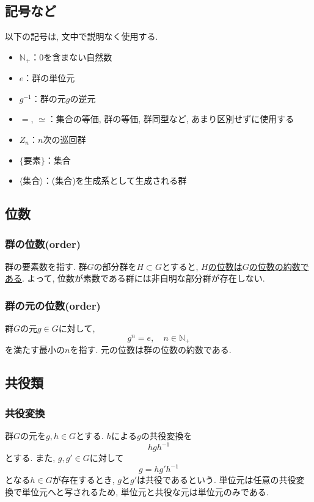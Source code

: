 \documentclass[11pt, a4paper]{jsarticle}
\begin{document}
\subsection{記号など}
以下の記号は, 文中で説明なく使用する.
\begin{itemize}
\item $\mathbb{N}_+$：0を含まない自然数
\item $e$：群の単位元
\item $g^{-1}$：群の元$g$の逆元
\item $=$, $\simeq$：集合の等価, 群の等価, 群同型など, あまり区別せずに使用する
\item $Z_n$：$n$次の巡回群
\item $\{\text{要素}\}$：集合
\item $\langle\text{集合}\rangle$：(集合)を生成系として生成される群
\end{itemize}

\subsection{位数}
\subsubsection{群の位数(order)}
群の要素数を指す.
群$G$の部分群を$H \subset G$とすると, \uline{$H$の位数は$G$の位数の約数である}.
よって, 位数が素数である群には非自明な部分群が存在しない.

\subsubsection{群の元の位数(order)}
群$G$の元$g\in G$に対して,
\begin{equation}
	g^n = e,\quad n\in\mathbb{N}_+
\end{equation}
を満たす最小の$n$を指す.
元の位数は群の位数の約数である.

\subsection{共役類}
\subsubsection{共役変換}
群$G$の元を$g,h\in G$とする.
$h$による$g$の共役変換を
\begin{equation}
 h g h^{-1}
\end{equation}
とする.
また, $g,g'\in G$に対して
\begin{equation}
 g = h g' h^{-1}
\end{equation}
となる$h\in G$が存在するとき, $g$と$g'$は共役であるという. 
単位元は任意の共役変換で単位元へと写されるため, 単位元と共役な元は単位元のみである.
\end{document}
